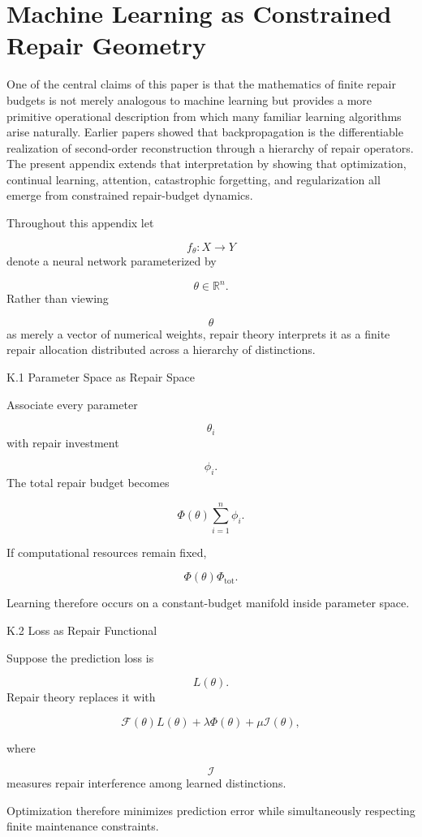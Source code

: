 \documentclass[12pt,oneside]{article}
\theoremstyle{plain}
\theoremstyle{definition}
\theoremstyle{remark}
\begin{document}
\section{Machine Learning as Constrained Repair Geometry}

One of the central claims of this paper is that the mathematics of finite repair budgets is not merely analogous to machine learning but provides a more primitive operational description from which many familiar learning algorithms arise naturally. Earlier papers showed that backpropagation is the differentiable realization of second-order reconstruction through a hierarchy of repair operators. The present appendix extends that interpretation by showing that optimization, continual learning, attention, catastrophic forgetting, and regularization all emerge from constrained repair-budget dynamics.

Throughout this appendix let

\[
f_\theta
:
X
\rightarrow
Y
\]
denote a neural network parameterized by

\[
\theta\in\mathbb R^n.
\]
Rather than viewing

\[
\theta
\]
as merely a vector of numerical weights, repair theory interprets it as a finite repair allocation distributed across a hierarchy of distinctions.


K.1 Parameter Space as Repair Space

Associate every parameter

\[
\theta_i
\]
with repair investment

\[
\phi_i.
\]
The total repair budget becomes

\[
\Phi(\theta)
\sum_{i=1}^{n}
\phi_i.
\]

If computational resources remain fixed,

\[
\Phi(\theta)
\Phi_{\mathrm{tot}}.
\]

Learning therefore occurs on a constant-budget manifold inside parameter space.


K.2 Loss as Repair Functional

Suppose the prediction loss is

\[
L(\theta).
\]
Repair theory replaces it with

\[
\mathcal F(\theta)
L(\theta)
+
\lambda\Phi(\theta)
+
\mu\mathcal I(\theta),
\]

where

\[
\mathcal I
\]
measures repair interference among learned distinctions.

Optimization therefore minimizes prediction error while simultaneously respecting finite maintenance constraints.
\end{document}
